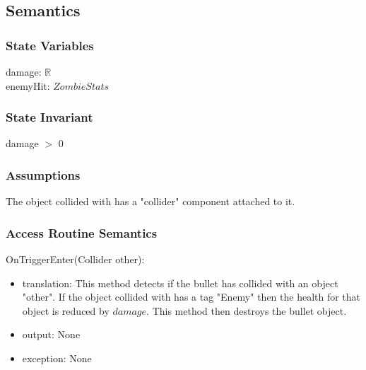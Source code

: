 \documentclass[12pt]{article}
\begin{document}
\subsection* {Semantics}

\subsubsection* {State Variables}

damage: $\mathbb{R}$\\
enemyHit: $ZombieStats$

\subsubsection* {State Invariant}

damage $>$ 0
\subsubsection* {Assumptions}

The object collided with has a "collider" component attached to it.

\subsubsection* {Access Routine Semantics}

\noindent OnTriggerEnter(Collider other):
\begin{itemize}
	\item translation: This method detects if the bullet has collided with an object "other". If the object collided with has a tag "Enemy" then the health for that object is reduced by $damage$. This method then destroys the bullet object.
	\item output: None
	\item exception: None
\end{itemize}
\end{document}
